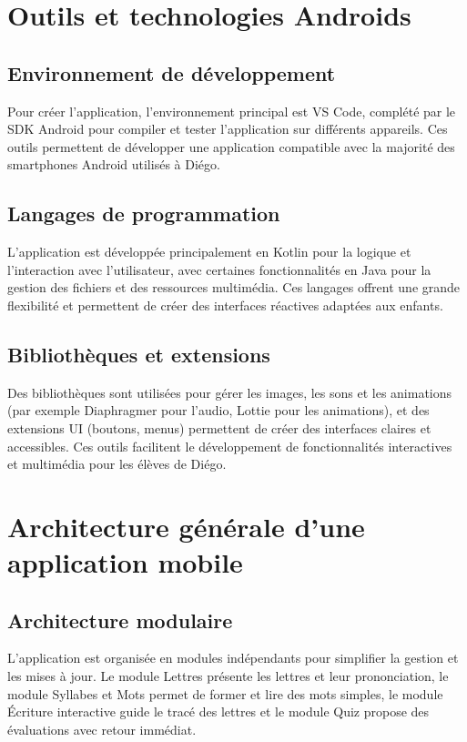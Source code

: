 \documentclass[a4paper,oneside,12pt]{book}
\begin{document}
\section{Outils et technologies Androids}
\subsection{Environnement de développement }
Pour créer l'application, l'environnement principal est VS Code, complété par le SDK Android pour compiler et tester l'application sur différents appareils. Ces outils permettent de développer une application compatible avec la majorité des smartphones Android utilisés à Diégo.


\subsection{Langages de programmation}
L'application est développée principalement en Kotlin pour la logique et l'interaction avec l'utilisateur, avec certaines fonctionnalités en Java pour la gestion des fichiers et des ressources multimédia. Ces langages offrent une grande flexibilité et permettent de créer des interfaces réactives adaptées aux enfants.

\subsection{Bibliothèques et extensions}
Des bibliothèques sont utilisées pour gérer les images, les sons et les animations (par exemple Diaphragmer pour l'audio, Lottie pour les animations), et des extensions UI (boutons, menus) permettent de créer des interfaces claires et accessibles. Ces outils facilitent le développement de fonctionnalités interactives et multimédia pour les élèves de Diégo.


\section{Architecture générale d'une application mobile}
\subsection{Architecture modulaire}
L'application est organisée en modules indépendants pour simplifier la gestion et les mises à jour. Le module Lettres présente les lettres et leur prononciation, le module Syllabes et Mots permet de former et lire des mots simples, le module Écriture interactive guide le tracé des lettres et le module Quiz propose des évaluations avec retour immédiat.
\end{document}
